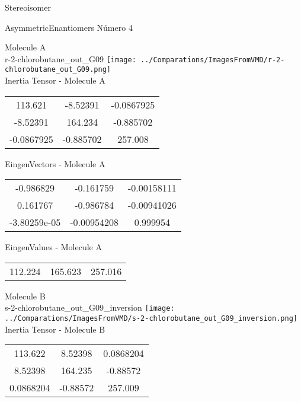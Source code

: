 \begin{center}
\vtab
\vtab
\textcolor{NavyBlue}{\Large Stereoisomer}
\end{center}

 \newpage

\vtab[-2cm]
\begin{center}
{\large AsymmetricEnantiomers \tab Número 4}
\end{center}
\begin{multicols}{2}
\begin{center}

Molecule A \\ 
r-2-chlorobutane\_out\_G09
\texttt{[image: ../Comparations/ImagesFromVMD/r-2-chlorobutane\_out\_G09.png]}
\\
Inertia Tensor - Molecule A \\
\vtab

\begin{tabular}{|c c c|}
113.621	 & 	-8.52391	 & 	-0.0867925	 \\
-8.52391	 & 	164.234	 & 	-0.885702	 \\
-0.0867925	 & 	-0.885702	 & 	257.008
\end{tabular}

\vtab
 EingenVectors - Molecule A     \\
\vtab
\begin{tabular}{|c c c|}
-0.986829	 & 	-0.161759	 & 	-0.00158111	 \\
0.161767	 & 	-0.986784	 & 	-0.00941026	 \\
-3.80259e-05	 & 	-0.00954208	 & 	0.999954
\end{tabular}

\vtab
 EingenValues - Molecule A     \\
\vtab
\begin{tabular}{|c c c|}
112.224	 & 	165.623	 & 	257.016	 \\
\end{tabular}
\columnbreak

Molecule B \\ 
s-2-chlorobutane\_out\_G09\_inversion
\texttt{[image: ../Comparations/ImagesFromVMD/s-2-chlorobutane\_out\_G09\_inversion.png]}
\\
Inertia Tensor - Molecule B \\
\vtab

\begin{tabular}{|c c c|}
113.622	 & 	8.52398	 & 	0.0868204	 \\
8.52398	 & 	164.235	 & 	-0.88572	 \\
0.0868204	 & 	-0.88572	 & 	257.009
\end{tabular}


\end{center}
\end{multicols}

